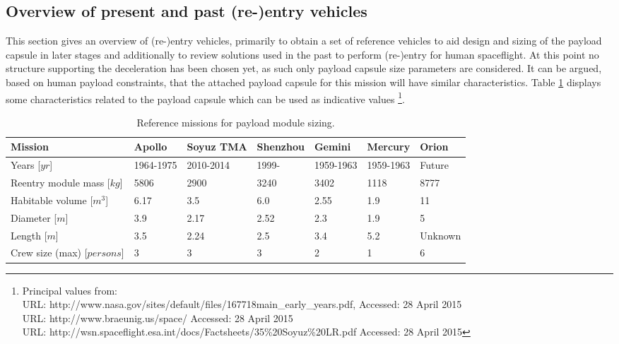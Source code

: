 \subsection{Overview of present and past (re-)entry vehicles}\label{cha:past missions}
This section gives an overview of (re-)entry vehicles, primarily to obtain a set of reference vehicles to aid design and sizing of the payload capsule in later stages and additionally to review solutions used in the past to perform (re-)entry for human spaceflight. At this point no structure supporting the deceleration has been chosen yet, as such only payload capsule size parameters are considered. It can be argued, based on human payload constraints, that the attached payload capsule for this mission will have similar characteristics. Table \ref{tab:refmis} displays some characteristics related to the payload capsule which can be used as indicative values \footnote{Principal values from: \\
URL: http://www.nasa.gov/sites/default/files/167718main\_early\_years.pdf,  Accessed: 28 April 2015 \\ URL: http://www.braeunig.us/space/  Accessed: 28 April 2015 \\ URL: http://wsn.spaceflight.esa.int/docs/Factsheets/35\%20Soyuz\%20LR.pdf Accessed: 28 April 2015
}. 

\begin{table}[H]
	\caption[Reference missions for payload module sizing]{Reference missions for payload module sizing.}
		\begin{tabular}{|p{}|p{}|p{}|p{}|p{}|p{}|p{}|} %
			\hline
			Mission 						& Apollo & 	Soyuz TMA &	Shenzhou & Gemini & Mercury & Orion \\ \hline \hline
			Years [$yr$]					&	1964-1975	& 	2010-2014&	1999- &   1959-1963  & 1959-1963 & Future \\ \hline
			Reentry module mass [$kg$]  	&	5806& 	2900 &	3240 & 3402 & 1118 & 8777 \\ \hline
			Habitable volume [$m^3$]		&	6.17& 	3.5  &	6.0  & 2.55 & 1.9 & 11   \\ \hline
			Diameter [$m$]			 		&	3.9 & 	2.17  &	2.52 & 2.3 & 1.9 & 5   \\ \hline
			Length  [$m$]			 		&	3.5 & 	2.24  &	2.5  & 3.4 &  5.2 & Unknown  \\ \hline
			Crew size (max) [$persons$]		&	3   & 	3     &	3    & 2   &  1   & 6   \\ \hline
		\end{tabular}
    \label{tab:refmis}
\end{table}


